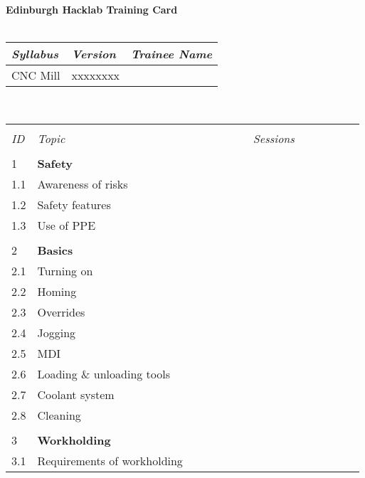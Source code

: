 \documentclass[a5paper]{article}
\begin{document}
\noindent
\textbf{Edinburgh Hacklab Training Card} \\
\\
\begin{tabularx}{\textwidth}{|l|l|X|}
\hline
\textit{Syllabus} & \textit{Version} & \textit{Trainee Name} \\
\hline
CNC Mill & xxxxxxxx & \\
\hline
\end{tabularx}
\\[2ex]
\begin{tabularx}{\textwidth}{|l|X|c|c|c|c|c|c|c|c|c|c|c|c|c|c|c|}
    \hline
    & & \multicolumn{15}{c|}{} \\
    \textit{ID} & \textit{Topic} & \multicolumn{15}{c|}{\textit{Sessions}} \\
    \hline
    & \multicolumn{16}{c|}{} \\
    1 & \multicolumn{1}{l}{\textbf{Safety}} & \multicolumn{15}{c|}{} \\
    \hline
    1.1 & Awareness of risks
    & & & & & & & & & & & & & & & \\ \hline
    1.2 & Safety features
    & & & & & & & & & & & & & & & \\ \hline
    1.3 & Use of PPE
    & & & & & & & & & & & & & & & \\ \hline
    & \multicolumn{16}{c|}{} \\
    2 & \multicolumn{1}{l}{\textbf{Basics}} & \multicolumn{15}{c|}{} \\
    \hline
    2.1 & Turning on
    & & & & & & & & & & & & & & & \\ \hline
    2.2 & Homing
    & & & & & & & & & & & & & & & \\ \hline
    2.3 & Overrides
    & & & & & & & & & & & & & & & \\ \hline
    2.4 & Jogging
    & & & & & & & & & & & & & & & \\ \hline
    2.5 & MDI
    & & & & & & & & & & & & & & & \\ \hline
    2.6 & Loading \& unloading tools
    & & & & & & & & & & & & & & & \\ \hline
    2.7 & Coolant system
    & & & & & & & & & & & & & & & \\ \hline
    2.8 & Cleaning
    & & & & & & & & & & & & & & & \\ \hline
    & \multicolumn{16}{c|}{} \\
    3 & \multicolumn{1}{l}{\textbf{Workholding}} & \multicolumn{15}{c|}{} \\
    \hline
    3.1 & Requirements of workholding

\end{tabularx}
\end{document}
